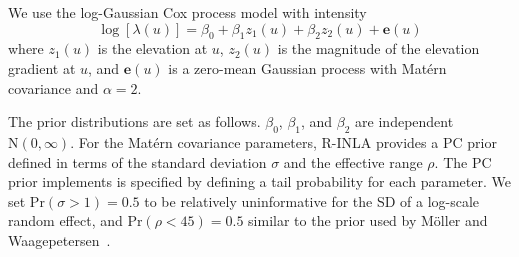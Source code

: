 \documentclass[]{interact}
\begin{document}
We use the log-Gaussian Cox process model with intensity
\begin{displaymath}
\log\left[\lambda(u)\right] = \beta_{0} + \beta_{1} z_{1}(u)
+ \beta_{2} z_{2}(u) + \mathbf{e}(u)
\end{displaymath}
where \(z_{1}(u)\) is the elevation at \(u\), \(z_{2}(u)\) is the magnitude of
the elevation gradient at \(u\), and \(\mathbf{e}(u)\) is a zero-mean Gaussian
process with Mat\'{e}rn covariance and \(\alpha = 2\).

The prior distributions are set as follows. \(\beta_{0}\), \(\beta_{1}\), and
\(\beta_{2}\) are independent \(\mathrm{N}(0, \infty)\). For the Mat\'{e}rn
covariance parameters, R-INLA provides a PC prior defined in terms of the
standard deviation \(\sigma\) and the effective range \(\rho\). The PC prior
implements is specified by defining a tail probability for each parameter. We
set \(\mathrm{Pr}(\sigma > 1) = 0.5\) to be relatively uninformative for the
SD of a log-scale random effect, and \(\mathrm{Pr}(\rho < 45) = 0.5\) similar
to the prior used by M\"{o}ller and Waagepetersen~\cite{moellerwaagepetersen}.
\end{document}
